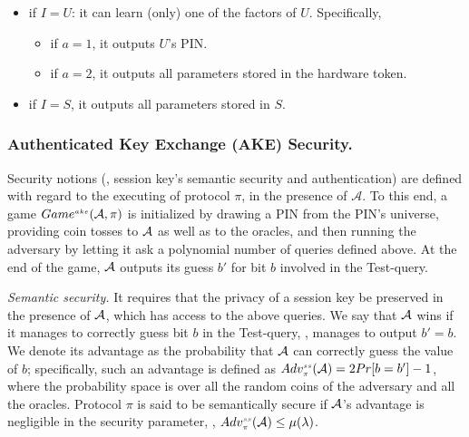 \begin{itemize}
\begin{itemize}

\item if $I=U$:  it can learn (only) one of the factors of $U$. Specifically, 
%



\begin{itemize}
\item if $a=1$, it outputs $U$'s PIN. 



\item if  $a=2$, it outputs all parameters stored in the hardware token. 
  \end{itemize}
  
  
  
\item if $I=S$, it outputs all parameters stored in $S$. 
\end{itemize}
\end{itemize}

\subsubsection{Authenticated Key Exchange (AKE)  Security.} Security notions (\ie, session key's semantic security and authentication) are defined with regard to the executing of protocol $\pi$, in the presence of   $\mathcal{A}$. To this end, a game $Game^{\scriptscriptstyle ake} (\mathcal{A},\pi)$ is initialized by drawing a PIN  from the PIN's universe,
providing coin tosses to $\mathcal{A}$ as well as to the oracles, and then running the adversary by letting it ask a polynomial
number of queries defined above. At the end of the game, $\mathcal{A}$  outputs its guess $b'$ for  bit $b$
involved in the Test-query. 



\noindent\textit{Semantic security.} It requires that the privacy of a session key be preserved in the presence of $\mathcal{A}$, which has access to the above queries. We say that $\mathcal{A}$  wins if it manages to correctly guess bit $b$ in the Test-query, \ie, manages to output $b'=b$. We denote its advantage as the probability that $\mathcal{A}$  can correctly guess the value of $b$; specifically, such an advantage is defined as $Adv_{\scriptscriptstyle\pi}^{\scriptscriptstyle ss}(\mathcal{A})=2Pr[b=b']-1$, where the probability space is over all the random coins of the adversary and all the oracles.  Protocol $\pi$ is said to be semantically secure if $\mathcal{A}$'s advantage is negligible in the security parameter, \ie, $Adv_{\scriptscriptstyle\pi}^{\scriptscriptstyle ss}(\mathcal{A})\leq \mu(\lambda)$.


